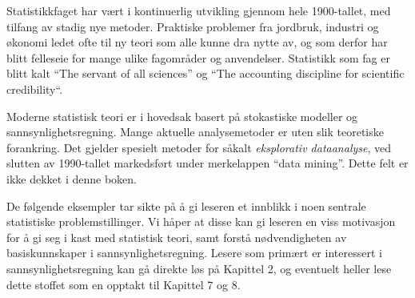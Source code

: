 Statistikkfaget har vært i kontinuerlig utvikling gjennom hele 1900-tallet,
med tilfang av stadig nye metoder. 
Praktiske problemer fra jordbruk, industri og økonomi ledet ofte til ny
teori som alle kunne dra nytte av, og som derfor har blitt felleseie for mange ulike 
fagområder og anvendelser. Statistikk som fag er blitt kalt 
``The servant of all sciences'' og ``The accounting discipline for scientific credibility``.

Moderne statistisk teori er i hovedsak basert
på stokastiske modeller og sannsynlighetsregning. Mange aktuelle analysemetoder 
er uten slik teoretiske forankring. Det gjelder spesielt 
metoder for såkalt {\em eksplorativ dataanalyse}, ved slutten av 1990-tallet
markedsført under merkelappen ``data mining''. Dette felt er ikke dekket i denne boken.

De følgende eksempler tar sikte på å gi leseren et innblikk i
noen sentrale statistiske problemstillinger.  Vi håper at disse
kan gi leseren en viss motivasjon for å gi seg i kast med
statistisk teori, samt forstå nødvendigheten av basiskunnskaper i
sannsynlighetsregning.  Lesere som primært er interessert i
sannsynlighetsregning kan gå direkte løs på Kapittel 2, og
eventuelt heller lese dette stoffet som en opptakt til Kapittel 7
og 8.\\

